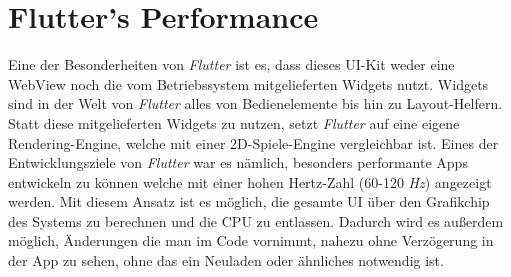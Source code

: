 \section{Flutter's Performance}
Eine der Besonderheiten von \textit{Flutter} ist es, dass dieses UI-Kit weder eine WebView
noch die vom Betriebssystem mitgelieferten Widgets nutzt. Widgets sind in der
Welt von \textit{Flutter} alles von Bedienelemente bis hin zu Layout-Helfern.
Statt diese mitgelieferten Widgets zu nutzen, setzt \textit{Flutter} auf eine
eigene Rendering-Engine, welche mit einer 2D-Spiele-Engine vergleichbar ist.
Eines der Entwicklungsziele von \textit{Flutter} war es nämlich,
besonders performante Apps entwickeln zu können welche mit einer hohen
Hertz-Zahl (60-120 \textit{Hz}) angezeigt werden. Mit diesem Ansatz ist es möglich,
die gesamte UI über den Grafikchip des Systems zu berechnen und die CPU zu entlassen.
Dadurch wird es außerdem möglich, Änderungen die man im Code vornimmt,
nahezu ohne Verzögerung in der App zu sehen, ohne das ein Neuladen oder ähnliches
notwendig ist.
